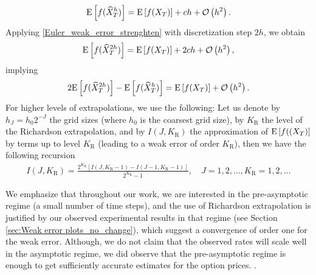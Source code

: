 \begin{align}\label{Euler_weak_error_strenghten}
	\mathrm{E}\left[f(\widehat{X}_T^h)\right]= \mathrm{E}\left[f(X_T)\right] + c h +{\mathcal{O}}\left(h^2\right) .
\end{align}
Applying \eqref{Euler_weak_error_strenghten} with discretization step $2h$, we  obtain
\begin{align*}
	\mathrm{E}\left[f(\widehat{X}_T^{2h})\right]= \mathrm{E}\left[f(X_T)\right] + 2 c h +{\mathcal{O}}\left(h^2\right) ,
\end{align*}
implying
\begin{align*}
	2 \mathrm{E}\left[f(\widehat{X}_T^{2h})\right]- \mathrm{E}\left[f(\widehat{X}_T^{h})\right] =\mathrm{E}\left[f(X_T)\right] + {\mathcal{O}}\left(h^2\right) .
\end{align*}
For higher levels of extrapolations, we use the following: Let us denote by $h_J=h_0 2^{-J}$ the grid sizes (where $h_0$ is the coarsest grid size), by $K_\text{R}$ the level of the Richardson extrapolation, and by $I(J,K_\text{R})$ the approximation of $\mathrm{E}\left[f((X_T)\right]$ by terms up to level $K_\text{R}$ (leading to a weak error of order $K_\text{R}$), then we have the following recursion 
\begin{align*}
I(J,K_\text{R})=\frac{2^{K_\text{R}}\left[I(J,K_\text{R}-1)-I(J-1,K_\text{R}-1)\right]}{2^{K_\text{R}}-1},\quad J=1,2,\dots, K_\text{R}=1,2,\dots
\end{align*}
\begin{remark}
We emphasize that throughout our work, we are interested in the pre-asymptotic regime (a small number of time steps), and the use of Richardson extrapolation is justified by our observed experimental results in that regime (see Section \ref{sec:Weak error plots_no_change}),  which suggest  a convergence of order one for the weak error. Although, we do not claim that the observed rates will scale well in the asymptotic regime, we did observe that the pre-asymptotic regime is enough to get sufficiently accurate estimates for the option prices. . 
\end{remark}
